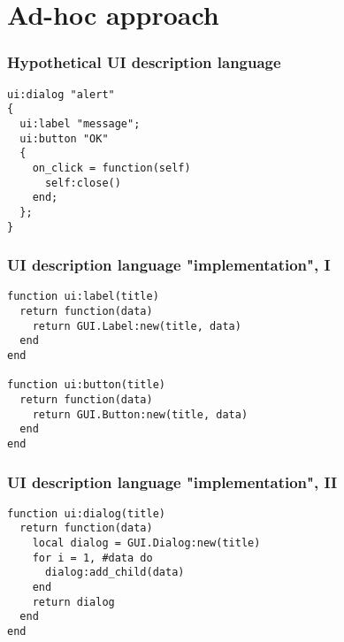 \documentclass[handout]{beamer}
\begin{document}

\section{Ad-hoc approach}


\begin{frame}[fragile]

\frametitle{Hypothetical UI description language}

\begin{verbatim}
ui:dialog "alert"
{
  ui:label "message";
  ui:button "OK"
  {
    on_click = function(self)
      self:close()
    end;
  };
}
\end{verbatim}

\end{frame}


\begin{frame}[fragile]

\frametitle{UI description language "implementation", I}

\begin{verbatim}
function ui:label(title)
  return function(data)
    return GUI.Label:new(title, data)
  end
end

function ui:button(title)
  return function(data)
    return GUI.Button:new(title, data)
  end
end
\end{verbatim}

\end{frame}


\begin{frame}[fragile]

\frametitle{UI description language "implementation", II}

\begin{verbatim}
function ui:dialog(title)
  return function(data)
    local dialog = GUI.Dialog:new(title)
    for i = 1, #data do
      dialog:add_child(data)
    end
    return dialog
  end
end
\end{verbatim}

\end{frame}
\end{document}
